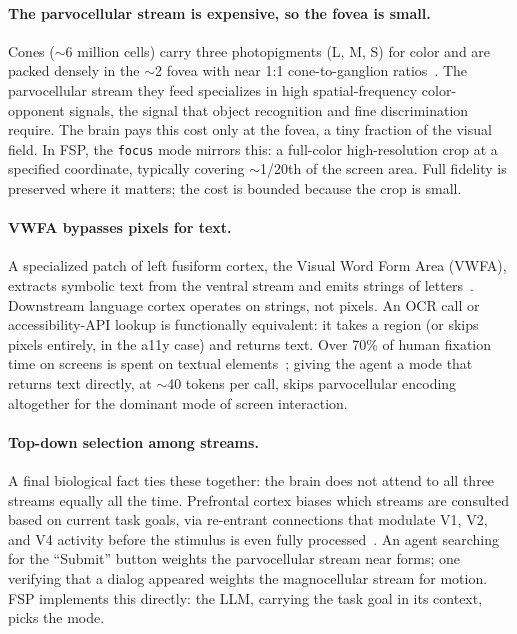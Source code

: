 \documentclass[11pt,a4paper]{article}
\begin{document}
\paragraph{The parvocellular stream is expensive, so the fovea is small.}
Cones ($\sim$6 million cells) carry three photopigments (L, M, S) for color and
are packed densely in the $\sim$2\textdegree{} fovea with near 1:1
cone-to-ganglion ratios~\cite{wandell2007visual,curcio-photoreceptor}. The
parvocellular stream they feed specializes in high spatial-frequency
color-opponent signals, the signal that object recognition and fine
discrimination require. The brain pays this cost only at the fovea, a tiny
fraction of the visual field. In FSP, the \texttt{focus} mode mirrors this:
a full-color high-resolution crop at a specified coordinate, typically covering
$\sim$1/20th of the screen area. Full fidelity is preserved where it matters;
the cost is bounded because the crop is small.

\paragraph{VWFA bypasses pixels for text.}
A specialized patch of left fusiform cortex, the Visual Word Form Area (VWFA),
extracts symbolic text from the ventral stream and emits strings of
letters~\cite{dehaene-cohen-vwfa}. Downstream language cortex operates on
strings, not pixels. An OCR call or accessibility-API lookup is functionally
equivalent: it takes a region (or skips pixels entirely, in the a11y case) and
returns text. Over 70\% of human fixation time on screens is spent on textual
elements~\cite{rayner-eye-movements}; giving the agent a mode that returns
text directly, at $\sim$40 tokens per call, skips parvocellular encoding
altogether for the dominant mode of screen interaction.

\paragraph{Top-down selection among streams.}
A final biological fact ties these together: the brain does not attend to all
three streams equally all the time. Prefrontal cortex biases which streams are
consulted based on current task goals, via re-entrant connections that modulate
V1, V2, and V4 activity before the stimulus is even fully
processed~\cite{desimone-duncan-attention,corbetta2002control}. An agent
searching for the ``Submit'' button weights the parvocellular stream near
forms; one verifying that a dialog appeared weights the magnocellular stream
for motion. FSP implements this directly: the LLM, carrying the task goal in
its context, picks the mode.
\end{document}
